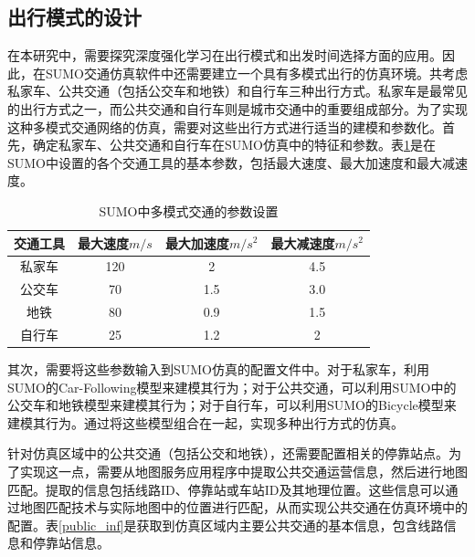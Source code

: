 \subsection{出行模式的设计}

在本研究中，需要探究深度强化学习在出行模式和出发时间选择方面的应用。因此，在SUMO交通仿真软件中还需要建立一个具有多模式出行的仿真环境。共考虑私家车、公共交通（包括公交车和地铁）和自行车三种出行方式。私家车是最常见的出行方式之一，而公共交通和自行车则是城市交通中的重要组成部分。为了实现这种多模式交通网络的仿真，需要对这些出行方式进行适当的建模和参数化。首先，确定私家车、公共交通和自行车在SUMO仿真中的特征和参数。表\ref{mode_inf}是在SUMO中设置的各个交通工具的基本参数，包括最大速度、最大加速度和最大减速度。

\renewcommand{\arraystretch}{1.2} %
\begin{table}[htbp]
\centering
\caption{SUMO中多模式交通的参数设置}
\label{mode_inf}
\begin{tabular}{cccc}
\toprule
交通工具 & 最大速度$m/s$ & 最大加速度$m/s^2$   & 最大减速度$m/s^2$  \\
\midrule
私家车          & 120            & 2          &     4.5         \\
公交车           & 70           & 1.5     &   3.0         \\ 
地铁            & 80       & 0.9            &  1.5  \\
自行车             & 25      & 1.2         &  2     \\
\bottomrule
\end{tabular}
\end{table}



其次，需要将这些参数输入到SUMO仿真的配置文件中。对于私家车，利用SUMO的Car-Following模型来建模其行为；对于公共交通，可以利用SUMO中的公交车和地铁模型来建模其行为；对于自行车，可以利用SUMO的Bicycle模型来建模其行为。通过将这些模型组合在一起，实现多种出行方式的仿真。

针对仿真区域中的公共交通（包括公交和地铁），还需要配置相关的停靠站点。为了实现这一点，需要从地图服务应用程序中提取公共交通运营信息，然后进行地图匹配。提取的信息包括线路ID、停靠站或车站ID及其地理位置。这些信息可以通过地图匹配技术与实际地图中的位置进行匹配，从而实现公共交通在仿真环境中的配置。表\ref{public_inf}是获取到仿真区域内主要公共交通的基本信息，包含线路信息和停靠站信息。

